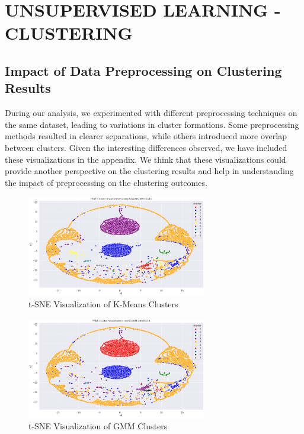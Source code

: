 
\section{UNSUPERVISED LEARNING - CLUSTERING}

    
    \subsection{Impact of Data Preprocessing on Clustering Results} %
    
        
    During our analysis, we experimented with different preprocessing techniques on the same dataset, leading to variations in cluster formations. Some preprocessing methods resulted in clearer separations, while others introduced more overlap between clusters. Given the interesting differences observed, we have included these visualizations in the appendix. We think that these visualizations could provide another perspective on the clustering results and help in understanding the impact of preprocessing on the clustering outcomes.

        \begin{figure}[H]
            \centering
            \includegraphics[width=0.7\textwidth]{../figures/plots/section3/tsne_kmeans_clusters_1.png}
            \caption{t-SNE Visualization of K-Means Clusters}
            \label{fig:tsne_kmeans}
        \end{figure}

        \begin{figure}[H]
            \centering
            \includegraphics[width=0.7\textwidth]{../figures/plots/section3/tsne_gmm_clusters_1.png}
            \caption{t-SNE Visualization of GMM Clusters}
            \label{fig:tsne_gmm}
        \end{figure}
        
